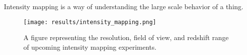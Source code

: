 Intensity mapping is a way of understanding the large scale behavior of a thing.

\begin{figure}[th]
	\centering
	\texttt{[image: results/intensity\_mapping.png]}
	\caption[Redshift and Resolution Coverage of Intensity Mapping Experiments]{A figure
					representing the resolution, field of view, and redshift range of upcoming intensity mapping
					experiments.}
	\label{fig:intensity_mapping}
\end{figure}
